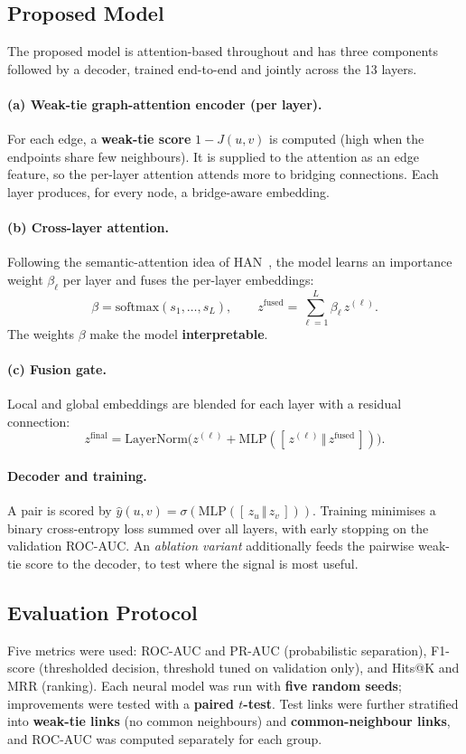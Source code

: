 \documentclass[11pt,a4paper]{article}
\begin{document}
\subsection{Proposed Model}
The proposed model is attention-based throughout and has three components followed by a decoder,
trained end-to-end and jointly across the 13 layers.

\paragraph{(a) Weak-tie graph-attention encoder (per layer).}
For each edge, a \textbf{weak-tie score} $1-J(u,v)$ is computed (high when the endpoints share few
neighbours). It is supplied to the attention as an edge feature, so the per-layer attention attends
more to bridging connections. Each layer produces, for every node, a bridge-aware embedding.

\paragraph{(b) Cross-layer attention.}
Following the semantic-attention idea of HAN~\cite{han2019}, the model learns an importance weight
$\beta_\ell$ per layer and fuses the per-layer embeddings:
\[
\beta=\mathrm{softmax}(s_1,\dots,s_L),\qquad z^{\text{fused}}=\sum_{\ell=1}^{L}\beta_\ell\,z^{(\ell)}.
\]
The weights $\beta$ make the model \textbf{interpretable}.

\paragraph{(c) Fusion gate.}
Local and global embeddings are blended for each layer with a residual connection:
\[
z^{\text{final}}=\mathrm{LayerNorm}\!\big(z^{(\ell)}+\mathrm{MLP}([\,z^{(\ell)}\,\Vert\,z^{\text{fused}}\,])\big).
\]

\paragraph{Decoder and training.}
A pair is scored by $\hat{y}(u,v)=\sigma(\mathrm{MLP}([\,z_u\,\Vert\,z_v\,]))$. Training minimises a
binary cross-entropy loss summed over all layers, with early stopping on the validation ROC-AUC. An
\emph{ablation variant} additionally feeds the pairwise weak-tie score to the decoder, to test where
the signal is most useful.

\subsection{Evaluation Protocol}
Five metrics were used: ROC-AUC and PR-AUC (probabilistic separation), F1-score (thresholded
decision, threshold tuned on validation only), and Hits@K and MRR (ranking). Each neural model was
run with \textbf{five random seeds}; improvements were tested with a \textbf{paired $t$-test}. Test
links were further stratified into \textbf{weak-tie links} (no common neighbours) and
\textbf{common-neighbour links}, and ROC-AUC was computed separately for each group.
\end{document}
